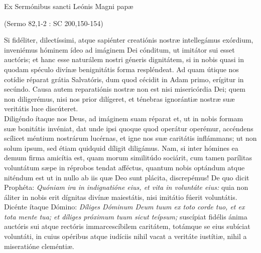 \documentclass[options]{article}
\begin{document}
	Ex Sermónibus sancti Leónis Magni papæ
	\begin{flushright}
			(Sermo 82,1-2 : SC 200,150-154)
	\end{flushright}
		
	Si fidéliter, dilectíssimi, atque sapiénter creatiónis nostræ intellegámus exórdium, inveniémus hóminem ídeo ad imáginem Dei cónditum, ut imitátor sui esset auctóris; et hanc esse naturálem nostri géneris dignitátem, si in nobis quasi in quodam spéculo divínæ benignitátis forma respléndeat. Ad quam útique nos cotídie réparat grátia Salvatóris, dum quod cécidit in Adam primo, erígitur in secúndo. Causa autem reparatiónis nostræ non est nisi misericórdia Dei; quem non diligerémus, nisi nos prior dilígeret, et ténebras ignorántiæ nostræ suæ veritátis luce discúteret.\\
	
	
	Diligéndo ítaque nos Deus, ad imáginem suam réparat et, ut in nobis formam suæ bonitátis invéniat, dat unde ipsi quoque quod operátur operémur, accéndens scílicet méntium nostrárum lucérnas, et igne nos suæ caritátis inflámmans; ut non solum ipsum, sed étiam quidquid díligit diligámus. Nam, si inter hómines ea demum firma amicítia est, quam morum similitúdo sociárit, cum tamen parílitas voluntátum sæpe in réprobos tendat afféctus, quantum nobis optándum atque niténdum est ut in nullo ab iis quæ Deo sunt plácita, discrepémus! De quo dicit Prophéta: 
	\emph{Quóniam ira in indignatióne eius, et vita in voluntáte eius:}
	quia non áliter in nobis erit dígnitas divínæ maiestátis, nisi imitátio fúerit voluntátis.\\
	
	
	Dicénte ítaque Dómino: 
	\emph{Díliges Dóminum Deum tuum ex toto corde tuo, et ex tota mente tua; et díliges próximum tuum sicut teípsum;} suscípiat fidélis ánima auctóris sui atque rectóris immarcescíbilem caritátem, totámque se eius subíciat voluntáti, in cuius opéribus atque iudíciis nihil vacat a veritáte iustítiæ, nihil a miseratióne cleméntiæ.
	
\end{document}
